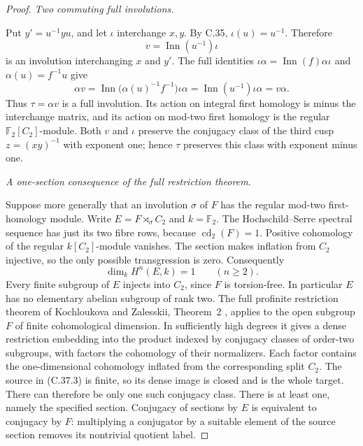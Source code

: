 \begin{proof}
\emph{Two commuting full involutions.}\par
Put \(y'=u^{-1}yu\), and let \(\iota\) interchange
\(x,y\). By C.35, \(\iota(u)=u^{-1}\). Therefore
\[
             v=\operatorname{Inn}(u^{-1})\iota
\]
is an involution interchanging \(x\) and \(y'\).
The full identities
\(\iota\alpha=\operatorname{Inn}(f)\alpha\iota\)
and \(\alpha(u)=f^{-1}u\) give
\[
 \alpha v
 =\operatorname{Inn}\bigl(\alpha(u)^{-1}f^{-1}\bigr)
       \iota\alpha
 =\operatorname{Inn}(u^{-1})\iota\alpha=v\alpha.
 \tag{C.37.2}
\]
Thus \(\tau=\alpha v\) is a full involution. Its action on
integral first homology is minus the interchange matrix, and its
action on mod-two first homology is the regular
\(\mathbb F_2[C_2]\)-module. Both \(v\) and \(\iota\)
preserve the conjugacy class of the third cusp
\(z=(xy)^{-1}\) with exponent one; hence \(\tau\)
preserves this class with exponent minus one.

\emph{A one-section consequence of the full restriction theorem.}\par
Suppose more generally that an involution \(\sigma\) of
\(F\) has the regular mod-two first-homology module.
Write \(E=F\rtimes_\sigma C_2\) and \(k=\mathbb F_2\).
The Hochschild--Serre spectral sequence has just its two fibre
rows, because \(\operatorname{cd}_2(F)=1\). Positive
cohomology of the regular \(k[C_2]\)-module vanishes.
The section makes inflation from \(C_2\) injective, so the
only possible transgression is zero. Consequently
\[
                      \dim_k H^n(E,k)=1\qquad(n\geq2).
 \tag{C.37.3}
\]
Every finite subgroup of \(E\) injects into \(C_2\),
since \(F\) is torsion-free. In particular \(E\) has no
elementary abelian subgroup of rank two. The full profinite
restriction theorem of Kochloukova and Zalesskii, Theorem~2
\cite{CEKochloukovaZalesskii2007}, applies to the open
subgroup \(F\) of finite cohomological dimension. In sufficiently
high degrees it gives a dense restriction embedding into the
product indexed by conjugacy classes of order-two subgroups,
with factors the cohomology of their normalizers. Each factor
contains the one-dimensional cohomology inflated from the
corresponding split \(C_2\). The source in (C.37.3) is finite,
so its dense image is closed and is the whole target. There
can therefore be only one such conjugacy class. There is at
least one, namely the specified section. Conjugacy of sections
by \(E\) is equivalent to conjugacy by \(F\): multiplying
a conjugator by a suitable element of the source section removes
its nontrivial quotient label.


\end{proof}
